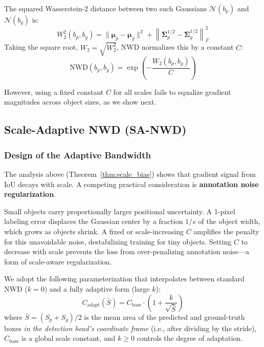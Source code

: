 \documentclass[journal]{IEEEtran}
\begin{document}
The squared Wasserstein-2 distance between two such Gaussians $\mathcal{N}(b_p)$ and $\mathcal{N}(b_g)$ is:
\begin{equation}
  W_2^2(b_p, b_g) = \|\boldsymbol{\mu}_p - \boldsymbol{\mu}_g\|^2 + \left\|\boldsymbol{\Sigma}_p^{1/2} - \boldsymbol{\Sigma}_g^{1/2}\right\|_F^2
\end{equation}
Taking the square root, $W_2 = \sqrt{W_2^2}$, NWD normalizes this by a constant $C$:
\begin{equation}
  \text{NWD}(b_p, b_g) = \exp\left(-\frac{W_2(b_p, b_g)}{C}\right)
\end{equation}

However, using a fixed constant $C$ for all scales fails to equalize gradient magnitudes across object sizes, as we show next.

\subsection{Scale-Adaptive NWD (SA-NWD)}
\label{sec:sanwd}

\subsubsection{Design of the Adaptive Bandwidth}

The analysis above (Theorem~\ref{thm:scale_bias}) shows that gradient signal from IoU decays with scale. A competing practical consideration is \textbf{annotation noise regularization}.

Small objects carry proportionally larger positional uncertainty. A 1-pixel labeling error displaces the Gaussian center by a fraction $1/s$ of the object width, which grows as objects shrink. A fixed or scale-increasing $C$ amplifies the penalty for this unavoidable noise, destabilizing training for tiny objects. Setting $C$ to decrease with scale prevents the loss from over-penalizing annotation noise---a form of scale-aware regularization.

We adopt the following parameterization that interpolates between standard NWD ($k=0$) and a fully adaptive form (large $k$):
\begin{equation}
  C_{\text{adapt}}(\bar{S}) = C_{\text{base}} \cdot \left(1 + \frac{k}{\sqrt{\bar{S}}}\right)
  \label{eq:c_adapt}
\end{equation}
where $\bar{S} = (S_p + S_g)/2$ is the mean area of the predicted and ground-truth boxes \emph{in the detection head's coordinate frame} (i.e., after dividing by the stride), $C_{\text{base}}$ is a global scale constant, and $k \geq 0$ controls the degree of adaptation.
\end{document}
